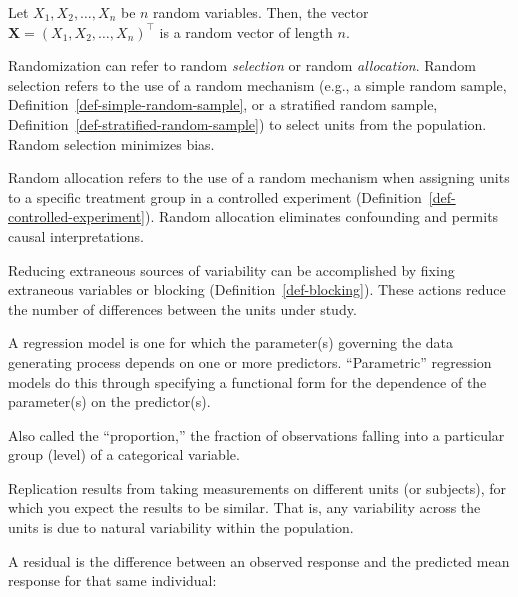 \documentclass[
  letterpaper,
  DIV=11,
  numbers=noendperiod]{scrreprt}
\providecommand{\tightlist}{%
  \setlength{\itemsep}{0pt}\setlength{\parskip}{0pt}}\usepackage{longtable,booktabs,array}
\theoremstyle{definition}
\theoremstyle{plain}
\theoremstyle{definition}
\theoremstyle{remark}
\begin{document}
\begin{description}
\tightlist
\item[Random Vector (Definition~\ref{def-random-vector})]
Let \(X_1, X_2, \dots, X_n\) be \(n\) random variables. Then, the vector
\(\mathbf{X} = \left(X_1, X_2, \dots, X_n\right)^\top\) is a random
vector of length \(n\).
\item[Randomization (Definition~\ref{def-randomization})]
Randomization can refer to random \emph{selection} or random
\emph{allocation}. Random selection refers to the use of a random
mechanism (e.g., a simple random sample,
Definition~\ref{def-simple-random-sample}, or a stratified random
sample, Definition~\ref{def-stratified-random-sample}) to select units
from the population. Random selection minimizes bias.
\end{description}

Random allocation refers to the use of a random mechanism when assigning
units to a specific treatment group in a controlled experiment
(Definition~\ref{def-controlled-experiment}). Random allocation
eliminates confounding and permits causal interpretations.

\begin{description}
\tightlist
\item[Reduction of Noise (Definition~\ref{def-noise-reduction})]
Reducing extraneous sources of variability can be accomplished by fixing
extraneous variables or blocking (Definition~\ref{def-blocking}). These
actions reduce the number of differences between the units under study.
\item[Regression (Definition~\ref{def-regression})]
A regression model is one for which the parameter(s) governing the data
generating process depends on one or more predictors. ``Parametric''
regression models do this through specifying a functional form for the
dependence of the parameter(s) on the predictor(s).
\item[Relative Frequency (Definition~\ref{def-relative-frequency})]
Also called the ``proportion,'' the fraction of observations falling
into a particular group (level) of a categorical variable.
\item[Replication (Definition~\ref{def-replication})]
Replication results from taking measurements on different units (or
subjects), for which you expect the results to be similar. That is, any
variability across the units is due to natural variability within the
population.
\item[Residual (Definition~\ref{def-residual})]
A residual is the difference between an observed response and the
predicted mean response for that same individual:
\end{description}
\end{document}
